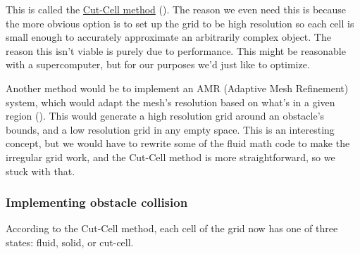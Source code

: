 \documentclass[a4paper,12pt,titlepage]{article}
\begin{document}
This is called the \href{https://www.sciencedirect.com/science/article/pii/S0307904X00000056}{Cut-Cell method} (\cite{cutcell}). The reason we even need this is because
the more obvious option is to set up the grid to be high resolution so each cell
is small enough to accurately approximate an arbitrarily complex object. The
reason this isn't viable is purely due to performance. This might be reasonable
with a supercomputer, but for our purposes we'd just like to optimize.

Another method would be to implement an AMR (Adaptive Mesh Refinement) system,
which would adapt the mesh's resolution based on what's in a given region (\cite{amr}). This would
generate a high resolution grid around an obstacle's bounds, and a low resolution
grid in any empty space. This is an interesting concept, but we would have to
rewrite some of the fluid math code to make the irregular grid work, and the Cut-Cell
method is more straightforward, so we stuck with that.

\subsubsection{Implementing obstacle collision}
According to the Cut-Cell method, each cell of the grid now has one of three states:
fluid, solid, or cut-cell.
\end{document}
